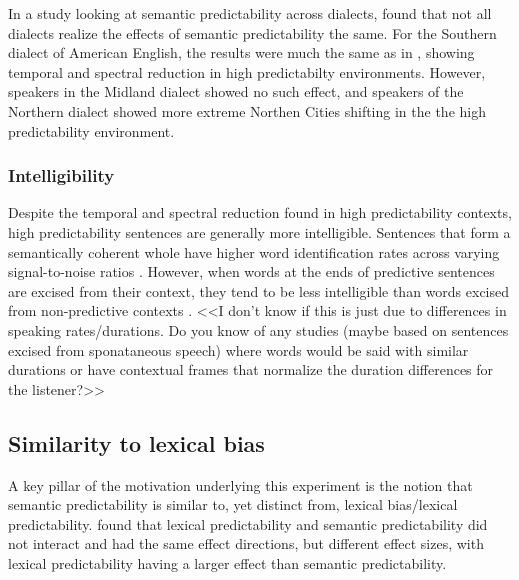 In a study looking at semantic predictability across dialects, \citet{ClopperPierrehumbert2008} found that not all dialects realize the effects of semantic predictability the same.  For the Southern dialect of American English, the results were much the same as in \citet{Scarborough2010}, showing temporal and spectral reduction in high predictabilty environments.  However, speakers in the Midland dialect showed no such effect, and speakers of the Northern dialect showed more extreme Northen Cities shifting in the the high predictability environment.

\subsubsection{Intelligibility}

Despite the temporal and spectral reduction found in high predictability contexts, high predictability sentences are generally more intelligible.  Sentences that form a semantically coherent whole have higher word identification rates across varying signal-to-noise ratios \citep{KalikowEtAl1977}.  However, when words at the ends of predictive sentences are excised from their context, they tend to be less intelligible than words excised from non-predictive contexts \citep{Lieberman1963}.  <<I don't know if this is just due to differences in speaking rates/durations.  Do you know of any studies (maybe based on sentences excised from sponataneous speech) where words would be said with similar durations or have contextual frames that normalize the duration differences for the listener?>>

\subsection{Similarity to lexical bias}

A key pillar of the motivation underlying this experiment is the notion that semantic predictability is similar to, yet distinct from, lexical bias/lexical predictability.  \citet{Scarborough2008} found that lexical predictability and semantic predictability did not interact and had the same effect directions, but different effect sizes, with lexical predictability having a larger effect than semantic predictability.

